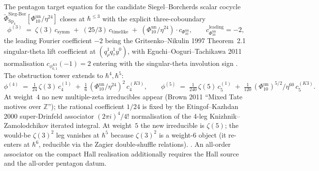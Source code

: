 \begin{remark}
\label{rem:nc-phi3-4-5}
The pentagon target equation for the candidate Siegel--Borcherds
scalar cocycle
$\widetilde{\Phi}^{\mathrm{Sieg\text{-}Bor}}_{\mathrm{Sp}_4}[\Phi_{10}^{\mathrm{un}}/\eta^{24}]$
closes at $\hbar^{\le 3}$ with the explicit three-coboundary
\[
\phi^{(3)} \;=\; \zeta(3)\,c_{\mathrm{symm}}
 \;+\;(25/3)\,c_{\mathrm{timelike}}
 \;+\;(\Phi_{10}^{\mathrm{un}}/\eta^{24})\cdot c_{\Phi_{10}^{\mathrm{un}}},
\qquad c_{\Phi_{10}^{\mathrm{un}}}^{\mathrm{leading}} = -2,
\]
the leading Fourier coefficient $-2$ being the
Gritsenko--Nikulin 1997 Theorem~2.1 singular-theta lift coefficient
at $(q_\rho^1 q_\tau^1 y^0)$, with Eguchi--Ooguri--Tachikawa 2011
normalisation $c_{\phi_{0,1}^{K3}}(-1) = 2$ entering with the
singular-theta involution sign
\cite{GritsenkoNikulin1997,EguchiOoguriTachikawa2011}.
The obstruction tower extends to $\hbar^4,\hbar^5$:
\[
\phi^{(4)} \;=\; \tfrac{1}{24}\,\zeta(3)\,c_4^{(1)}
 \;+\;\tfrac{1}{6}\,(\Phi_{10}^{\mathrm{un}}/\eta^{24})^2\,c_4^{(K3)},
\qquad
\phi^{(5)} \;=\; \tfrac{1}{240}\,\zeta(5)\,c_5^{(1)}
 \;+\;\tfrac{1}{120}\,(\Phi_{10}^{\mathrm{un}})^{5/2}/\eta^{60}\,c_5^{(K3)}.
\]
At weight~$4$ no new multiple-zeta irreducibles appear (Brown 2011
``Mixed Tate motives over $\mathbb Z$''); the rational coefficient
$1/24$ is fixed by the Etingof--Kazhdan 2000 super-Drinfeld associator
$(2\pi i)^4/4!$ normalisation of the 4-leg Knizhnik--Zamolodchikov
iterated integral. At weight~$5$ the new irreducible is $\zeta(5)$;
the would-be $\zeta(3)^2$ leg vanishes at $\hbar^5$ because
$\zeta(3)^2$ is a weight-$6$ object (it re-enters at $\hbar^6$,
reducible via the Zagier double-shuffle relations).
\cite{Brown2011,EtingofKazhdan2000,EnriquezGomezGonzalezMaassarani2022,
 GritsenkoNikulin1998,Drinfeld1990,MarklShniderStasheff2002}.
An all-order associator on the compact Hall realisation additionally
requires the Hall source and the all-order pentagon datum.
\end{remark}

